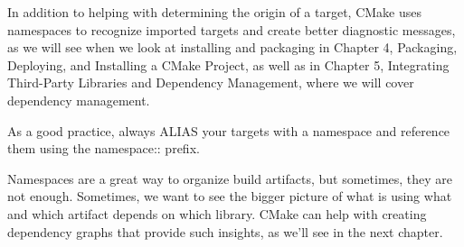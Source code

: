 In addition to helping with determining the origin of a target, CMake uses namespaces to recognize imported targets and create better diagnostic messages, as we will see when we look at installing and packaging in Chapter 4, Packaging, Deploying, and Installing a CMake Project, as well as in Chapter 5, Integrating Third-Party Libraries and Dependency Management, where we will cover dependency management.

\begin{tcolorbox}[colback=blue!5!white,colframe=blue!75!black,title=Always Use Namespaces]
As a good practice, always ALIAS your targets with a namespace and reference them using the namespace:: prefix.
\end{tcolorbox}

Namespaces are a great way to organize build artifacts, but sometimes, they are not enough. Sometimes, we want to see the bigger picture of what is using what and which artifact depends on which library. CMake can help with creating dependency graphs that provide such insights, as we'll see in the next chapter.














